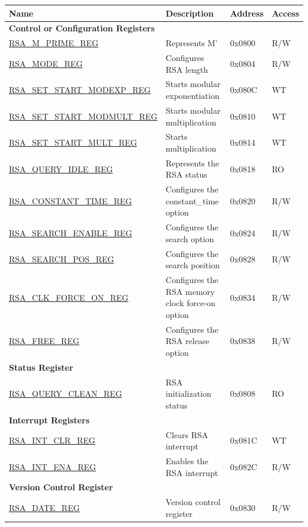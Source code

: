 \begin{longtable}{ | l | l | l | l | }
\hline\rowcolor{lightgray}
\textbf{Name} & \textbf{Description} &  \textbf{Address} & \textbf{Access} \\ \hline
\endhead
\multicolumn{4}{|l|}{\textbf{Control or Configuration Registers}} \\ \hline
\hyperref[regdesc:RSAMPRIMEREG]{RSA\_M\_PRIME\_REG} & Represents M' & 0x0800 & R/W \\ \hline
\hyperref[regdesc:RSAMODEREG]{RSA\_MODE\_REG} & Configures RSA length & 0x0804 & R/W \\ \hline
\hyperref[regdesc:RSASETSTARTMODEXPREG]{RSA\_SET\_START\_MODEXP\_REG} & Starts modular exponentiation & 0x080C & WT \\ \hline
\hyperref[regdesc:RSASETSTARTMODMULTREG]{RSA\_SET\_START\_MODMULT\_REG} & Starts modular multiplication & 0x0810 & WT \\ \hline
\hyperref[regdesc:RSASETSTARTMULTREG]{RSA\_SET\_START\_MULT\_REG} & Starts multiplication & 0x0814 & WT \\ \hline
\hyperref[regdesc:RSAQUERYIDLEREG]{RSA\_QUERY\_IDLE\_REG} & Represents the RSA status & 0x0818 & RO \\ \hline
\hyperref[regdesc:RSACONSTANTTIMEREG]{RSA\_CONSTANT\_TIME\_REG} & Configures the constant\_time option & 0x0820 & R/W \\ \hline
\hyperref[regdesc:RSASEARCHENABLEREG]{RSA\_SEARCH\_ENABLE\_REG} & Configures the search option & 0x0824 & R/W \\ \hline
\hyperref[regdesc:RSASEARCHPOSREG]{RSA\_SEARCH\_POS\_REG} & Configures the search position & 0x0828 & R/W \\ \hline
\hyperref[regdesc:RSACLKFORCEONREG]{RSA\_CLK\_FORCE\_ON\_REG} & Configures the RSA memory clock force-on option & 0x0834 & R/W \\ \hline
\hyperref[regdesc:RSAFREEREG]{RSA\_FREE\_REG} & Configures the RSA release option & 0x0838 & R/W \\ \hline
\multicolumn{4}{|l|}{\textbf{Status Register}} \\ \hline
\hyperref[regdesc:RSAQUERYCLEANREG]{RSA\_QUERY\_CLEAN\_REG} & RSA initialization status & 0x0808 & RO \\ \hline
\multicolumn{4}{|l|}{\textbf{Interrupt Registers}} \\ \hline
\hyperref[regdesc:RSAINTCLRREG]{RSA\_INT\_CLR\_REG} & Clears RSA interrupt & 0x081C & WT \\ \hline
\hyperref[regdesc:RSAINTENAREG]{RSA\_INT\_ENA\_REG} & Enables the RSA interrupt & 0x082C & R/W \\ \hline
\multicolumn{4}{|l|}{\textbf{Version Control Register}} \\ \hline
\hyperref[regdesc:RSADATEREG]{RSA\_DATE\_REG} & Version control register & 0x0830 & R/W \\ \hline
\end{longtable}
